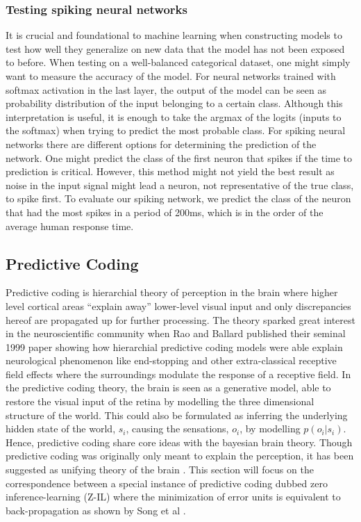 \documentclass[a4paper,11pt]{article}
\begin{document}
\subsubsection{Testing spiking neural networks}
It is crucial and foundational to machine learning when constructing models to test how well they generalize on new data that the model has not been exposed to before. When testing on a well-balanced categorical dataset, one might simply want to measure the accuracy of the model. For neural networks trained with softmax activation in the last layer, the output of the model can be seen as probability distribution of the input belonging to a certain class. Although this interpretation is useful, it is enough to take the argmax of the logits (inputs to the softmax) when trying to predict the most probable class. For spiking neural networks there are different options for determining the prediction of the network. One might predict the class of the first neuron that spikes if the time to prediction is critical. However, this method might not yield the best result as noise in the input signal might lead a neuron, not representative of the true class, to spike first. To evaluate our spiking network, we predict the class of the neuron that had the most spikes in a period of 200ms, which is in the order of the average human response time. 

\subsection{Predictive Coding}
Predictive coding is hierarchial theory of perception in the brain where higher level cortical areas ``explain away'' lower-level visual input and only discrepancies hereof are propagated up for further processing. The theory sparked great interest in the neuroscientific community when Rao and Ballard published their seminal 1999 paper \cite{raoballard1999} showing how hierarchial predictive coding models were able explain neurological phenomenon like end-stopping and other extra-classical receptive field effects where the surroundings modulate the response of a receptive field. In the predictive coding theory, the brain is seen as a generative model, able to restore the visual input of the retina by modelling the three dimensional structure of the world. This could also be formulated as inferring the underlying hidden state of the world, $s_i$, causing the sensations, $o_i$, by modelling $p(o_i | s_i)$. Hence, predictive coding share core ideas with the bayesian brain theory. Though predictive coding was originally only meant to explain the perception, it has been suggested as unifying theory of the brain \cite{millidge2021predictive}. This section will focus on the correspondence between a special instance of predictive coding dubbed zero inference-learning (Z-IL) where the minimization of error units is equivalent to back-propagation as shown by Song et al \cite{PredictiveCodingNetworks}.
\end{document}
